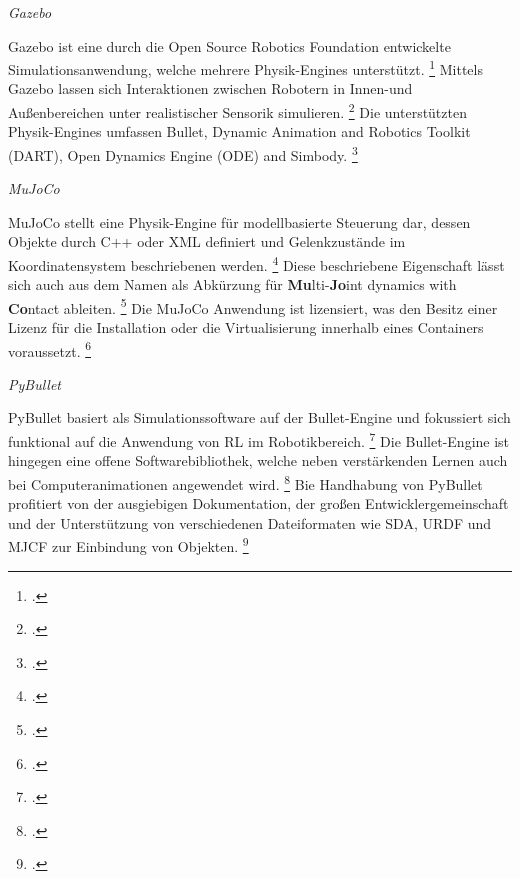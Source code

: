 \textit{Gazebo}

Gazebo ist eine durch die Open Source Robotics Foundation entwickelte Simulationsanwendung, welche mehrere Physik-Engines unterstützt. \footcite[Vgl.][S. 7]{Ivaldi.2272014}
Mittels Gazebo lassen sich Interaktionen zwischen Robotern in Innen-und Außenbereichen unter realistischer Sensorik simulieren. \footcite[Vgl.][S. 4]{Ayala.2020}
Die unterstützten Physik-Engines umfassen Bullet, Dynamic Animation and Robotics Toolkit (DART), Open Dynamics Engine (ODE) and Simbody. \footcite[Vgl.][S. 3]{Korber.2021}

\textit{MuJoCo}

MuJoCo stellt eine Physik-Engine für modellbasierte Steuerung dar, dessen Objekte durch C++ oder XML definiert und Gelenkzustände im Koordinatensystem beschriebenen werden. \footcite[Vgl.][S. 1]{Todorov.2012} 
Diese beschriebene Eigenschaft lässt sich auch aus dem Namen als Abkürzung für \textbf{Mu}lti-\textbf{Jo}int dynamics with \textbf{Co}ntact ableiten. \footcite[Vgl.][S. 2]{Todorov.2012}
Die MuJoCo Anwendung ist lizensiert, was den Besitz einer Lizenz für die Installation oder die Virtualisierung innerhalb eines Containers voraussetzt. \footcite[Vgl.][S. 3]{Korber.2021}

\textit{PyBullet}

PyBullet basiert als Simulationssoftware auf der Bullet-Engine und fokussiert sich funktional auf die Anwendung von RL im Robotikbereich. \footcite[Vgl.][S. 3]{Korber.2021}
Die Bullet-Engine ist hingegen eine offene Softwarebibliothek, welche neben verstärkenden Lernen auch bei Computeranimationen angewendet wird. \footcite[Vgl.][S. 7]{Ivaldi.2272014}
Bie Handhabung von PyBullet profitiert von der ausgiebigen Dokumentation, der großen Entwicklergemeinschaft und der Unterstützung von verschiedenen Dateiformaten wie SDA, URDF und MJCF zur Einbindung von Objekten. \footcite[Vgl.][S. 6]{Korber.2021}


